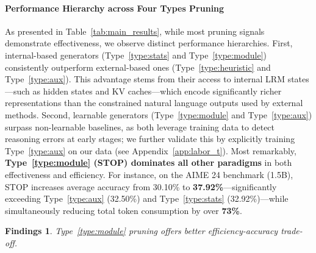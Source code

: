 \documentclass[11pt]{article}
\theoremstyle{plain}
\newtheorem{findings}{Findings}
\begin{document}
\paragraph{Performance Hierarchy across Four Types Pruning}
As presented in Table~\ref{tab:main_results}, while most pruning signals demonstrate effectiveness, we observe distinct performance hierarchies. 
First, internal-based generators (Type~\ref{type:stats} and Type~\ref{type:module}) consistently outperform external-based ones (Type~\ref{type:heuristic} and Type~\ref{type:aux}). 
This advantage stems from their access to internal LRM states—such as hidden states and KV caches—which encode significantly richer representations than the constrained natural language outputs used by external methods. 
Second, learnable generators (Type~\ref{type:module} and Type~\ref{type:aux}) surpass non-learnable baselines, as both leverage training data to detect reasoning errors at early stages; we further validate this by explicitly training Type~\ref{type:aux} on our data (see Appendix~\ref{app:labor_t}). 
Most remarkably, \textbf{Type~\ref{type:module} (STOP) dominates all other paradigms} in both effectiveness and efficiency. 
For instance, on the AIME 24 benchmark (1.5B), STOP increases average accuracy from 30.10\% to \textbf{37.92\%}—significantly exceeding Type~\ref{type:aux} (32.50\%) and Type~\ref{type:stats} (32.92\%)—while simultaneously reducing total token consumption by over \textbf{73\%}.

\begin{findings}
Type~\ref{type:module} pruning offers better efficiency-accuracy trade-off.
\end{findings}

\end{document}
